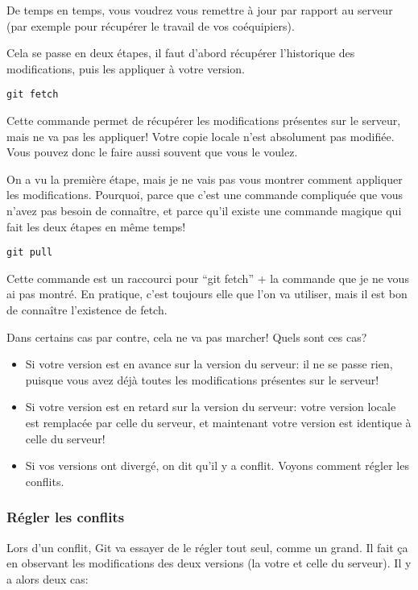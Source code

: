 \documentclass[10pt,a4paper]{article}
\begin{document}
De temps en temps, vous voudrez vous remettre à jour par rapport au serveur (par exemple pour récupérer le travail de vos coéquipiers).

Cela se passe en deux étapes, il faut d'abord récupérer l'historique des modifications, puis les appliquer à votre version.

\begin{verbatim}
git fetch
\end{verbatim}

Cette commande permet de récupérer les modifications présentes sur le serveur, mais ne va pas les appliquer! Votre copie locale n'est absolument pas modifiée. Vous pouvez donc le faire aussi souvent que vous le voulez.

On a vu la première étape, mais je ne vais pas vous montrer comment appliquer les modifications. Pourquoi, parce que c'est une commande compliquée que vous n'avez pas besoin de connaître, et parce qu'il existe une commande magique qui fait les deux étapes en même temps!

\begin{verbatim}
git pull
\end{verbatim}

Cette commande est un raccourci pour ``git fetch'' + la commande que je ne vous ai pas montré. En pratique, c'est toujours elle que l'on va utiliser, mais il est bon de connaître l'existence de fetch.

Dans certains cas par contre, cela ne va pas marcher! Quels sont ces cas?

\begin{itemize}
\item Si votre version est en avance sur la version du serveur: il ne se passe rien, puisque vous avez déjà toutes les modifications présentes sur le serveur!
\item Si votre version est en retard sur la version du serveur: votre version locale est remplacée par celle du serveur, et maintenant votre version est identique à celle du serveur!
\item Si vos versions ont divergé, on dit qu'il y a conflit. Voyons comment régler les conflits.
\end{itemize}

\subsubsection{Régler les conflits\label{régler-conflits}}

Lors d'un conflit, Git va essayer de le régler tout seul, comme un grand. Il fait ça en observant les modifications des deux versions (la votre et celle du serveur). Il y a alors deux cas:
\end{document}
